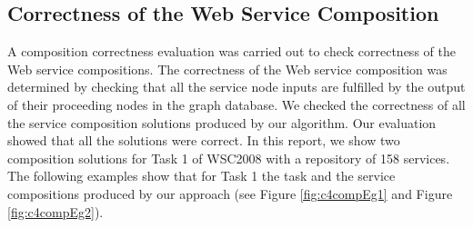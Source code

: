 \begin{table}[]
\centering
\caption{Comparison of the number of services in the original repositories and the reduced repositories}
\label{tb:reduce}
\end{table}

\subsection{Correctness of the Web Service Composition} 
A composition correctness evaluation was carried out to check correctness of the Web service compositions. The correctness of the Web service composition was determined by checking that all the service node inputs are fulfilled by the output of their proceeding nodes in the graph database. We checked the correctness of all the service composition solutions produced by our algorithm. Our evaluation showed that all the solutions were correct. In this report, we show two composition solutions for Task 1 of WSC2008 with a repository of 158 services. The following examples show that for Task 1 the task and the service compositions produced by our approach (see Figure \ref{fig:c4compEg1} and Figure \ref{fig:c4compEg2}).\\

